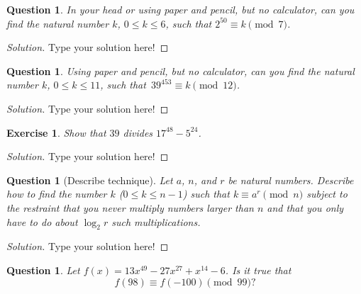 \documentclass[11pt,leqno]{article}
\newtheorem{exer}[thm]{Exercise}
\newtheorem{ques}[thm]{Question}
\theoremstyle{definition}
\begin{document}
\begin{ques}
In your head or using paper and pencil, but no calculator, can you
find the natural number $k$, $0 \leq k \leq 6$, such that $2^{50}
\equiv k \pmod{7}$.
\end{ques}

\begin{proof}[Solution]
Type your solution here!
\end{proof}

\begin{ques}
Using paper and pencil, but no calculator, can you find the natural
number $k$, $0 \leq k \leq 11$, such that~$39^{453} \equiv k
\pmod{12}$.
\end{ques}

\begin{proof}[Solution]
Type your solution here!
\end{proof}

\begin{exer}
Show that $39$ divides $17^{48}-5^{24}$.
\end{exer}

\begin{proof}[Solution]
Type your solution here!
\end{proof}

\begin{ques}[Describe technique]
Let $a$, $n$, and $r$ be natural numbers.  Describe how to find the
number $k$ ($0 \leq k \leq n - 1$) such that $k \equiv a^r \pmod{n}$
subject to the restraint that you never multiply numbers larger than
$n$ and that you only have to do about $\log_2{r}$ such
multiplications.
\end{ques}

\begin{proof}[Solution]
Type your solution here!
\end{proof}

\begin{ques}
Let $f(x) = 13x^{49} - 27x^{27} + x^{14} - 6$.  Is it true that
\[f(98) \equiv f(-100) \pmod{99}?\]
\end{ques}
\end{document}
